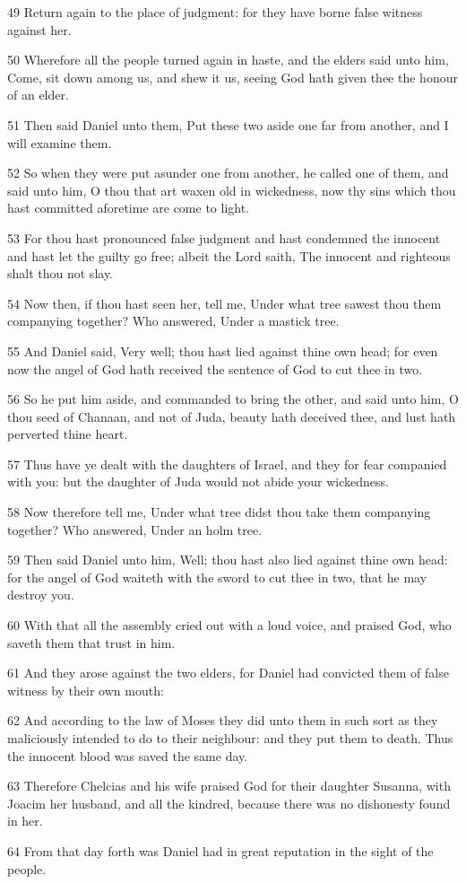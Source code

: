 \par 49 Return again to the place of judgment: for they have borne false witness against her.
\par 50 Wherefore all the people turned again in haste, and the elders said unto him, Come, sit down among us, and shew it us, seeing God hath given thee the honour of an elder.
\par 51 Then said Daniel unto them, Put these two aside one far from another, and I will examine them.
\par 52 So when they were put asunder one from another, he called one of them, and said unto him, O thou that art waxen old in wickedness, now thy sins which thou hast committed aforetime are come to light.
\par 53 For thou hast pronounced false judgment and hast condemned the innocent and hast let the guilty go free; albeit the Lord saith, The innocent and righteous shalt thou not slay.
\par 54 Now then, if thou hast seen her, tell me, Under what tree sawest thou them companying together? Who answered, Under a mastick tree.
\par 55 And Daniel said, Very well; thou hast lied against thine own head; for even now the angel of God hath received the sentence of God to cut thee in two.
\par 56 So he put him aside, and commanded to bring the other, and said unto him, O thou seed of Chanaan, and not of Juda, beauty hath deceived thee, and lust hath perverted thine heart.
\par 57 Thus have ye dealt with the daughters of Israel, and they for fear companied with you: but the daughter of Juda would not abide your wickedness.
\par 58 Now therefore tell me, Under what tree didst thou take them companying together? Who answered, Under an holm tree.
\par 59 Then said Daniel unto him, Well; thou hast also lied against thine own head: for the angel of God waiteth with the sword to cut thee in two, that he may destroy you.
\par 60 With that all the assembly cried out with a loud voice, and praised God, who saveth them that trust in him.
\par 61 And they arose against the two elders, for Daniel had convicted them of false witness by their own mouth:
\par 62 And according to the law of Moses they did unto them in such sort as they maliciously intended to do to their neighbour: and they put them to death. Thus the innocent blood was saved the same day.
\par 63 Therefore Chelcias and his wife praised God for their daughter Susanna, with Joacim her husband, and all the kindred, because there was no dishonesty found in her.
\par 64 From that day forth was Daniel had in great reputation in the sight of the people.

